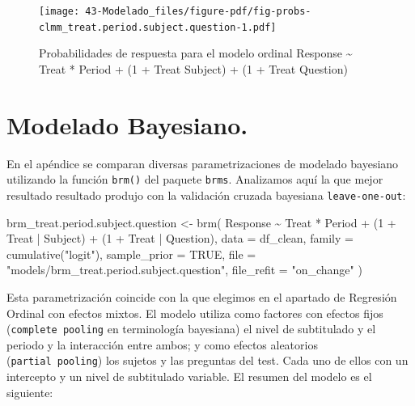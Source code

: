\documentclass[
  12pt,
  a4paper,
  extrafontsizes,
  onecolumn,
  openright]{memoir}
\newenvironment{Shaded}{\begin{snugshade}}{\end{snugshade}}
\newcommand{\AttributeTok}[1]{\textcolor[rgb]{0.40,0.45,0.13}{#1}}
\newcommand{\ConstantTok}[1]{\textcolor[rgb]{0.56,0.35,0.01}{#1}}
\newcommand{\DecValTok}[1]{\textcolor[rgb]{0.68,0.00,0.00}{#1}}
\newcommand{\FunctionTok}[1]{\textcolor[rgb]{0.28,0.35,0.67}{#1}}
\newcommand{\NormalTok}[1]{\textcolor[rgb]{0.00,0.23,0.31}{#1}}
\newcommand{\OtherTok}[1]{\textcolor[rgb]{0.00,0.23,0.31}{#1}}
\newcommand{\SpecialCharTok}[1]{\textcolor[rgb]{0.37,0.37,0.37}{#1}}
\newcommand{\StringTok}[1]{\textcolor[rgb]{0.13,0.47,0.30}{#1}}
\begin{document}
\begin{figure}[h]

{\centering \texttt{[image: 43-Modelado\_files/figure-pdf/fig-probs-clmm\_treat.period.subject.question-1.pdf]}

}

\caption{\label{fig-probs-clmm_treat.period.subject.question}Probabilidades
de respuesta para el modelo ordinal Response \textasciitilde{} Treat *
Period + (1 + Treat \textbar{} Subject) + (1 + Treat \textbar{}
Question)}

\end{figure}

\hypertarget{modelado-bayesiano.}{%
\section{Modelado Bayesiano.}\label{modelado-bayesiano.}}

En el apéndice se comparan diversas parametrizaciones de modelado
bayesiano utilizando la función \texttt{brm()} del paquete
\texttt{brms}. Analizamos aquí la que mejor resultado resultado produjo
con la validación cruzada bayesiana \texttt{leave-one-out}:

\scriptsize

\begin{Shaded}
\begin{Highlighting}[]
\NormalTok{brm\_treat.period.subject.question }\OtherTok{\textless{}{-}} \FunctionTok{brm}\NormalTok{(}
\NormalTok{    Response }\SpecialCharTok{\textasciitilde{}}\NormalTok{ Treat }\SpecialCharTok{*}\NormalTok{ Period }\SpecialCharTok{+}\NormalTok{ (}\DecValTok{1} \SpecialCharTok{+}\NormalTok{ Treat }\SpecialCharTok{|}\NormalTok{ Subject) }\SpecialCharTok{+}\NormalTok{ (}\DecValTok{1} \SpecialCharTok{+}\NormalTok{ Treat }\SpecialCharTok{|}\NormalTok{ Question),}
    \AttributeTok{data =}\NormalTok{ df\_clean,}
    \AttributeTok{family =} \FunctionTok{cumulative}\NormalTok{(}\StringTok{"logit"}\NormalTok{),}
    \AttributeTok{sample\_prior =} \ConstantTok{TRUE}\NormalTok{,}
    \AttributeTok{file =} \StringTok{"models/brm\_treat.period.subject.question"}\NormalTok{,}
    \AttributeTok{file\_refit =} \StringTok{"on\_change"}
\NormalTok{)}
\end{Highlighting}
\end{Shaded}

\normalsize

Esta parametrización coincide con la que elegimos en el apartado de
Regresión Ordinal con efectos mixtos. El modelo utiliza como factores
con efectos fijos (\texttt{complete\ pooling} en terminología bayesiana)
el nivel de subtitulado y el periodo y la interacción entre ambos; y
como efectos aleatorios (\texttt{partial\ pooling}) los sujetos y las
preguntas del test. Cada uno de ellos con un intercepto y un nivel de
subtitulado variable. El resumen del modelo es el siguiente:
\end{document}
